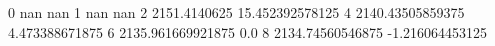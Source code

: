 0 nan nan
1 nan nan
2 2151.4140625 15.452392578125
4 2140.43505859375 4.473388671875
6 2135.961669921875 0.0
8 2134.74560546875 -1.216064453125
